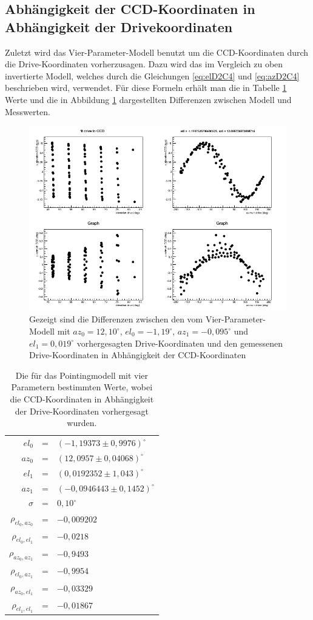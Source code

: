 \subsection{Abhängigkeit der CCD-Koordinaten in Abhängigkeit der Drivekoordinaten}
Zuletzt wird das Vier-Parameter-Modell benutzt um die CCD-Koordinaten durch die Drive-Koordinaten vorherzusagen. Dazu wird das im Vergleich zu oben invertierte Modell, welches durch die Gleichungen \ref{eq:elD2C4} und \ref{eq:azD2C4} beschrieben wird, verwendet. Für diese Formeln erhält man die in Tabelle \ref{tab:D2C4} Werte und die in Abbildung \ref{img:D2C4} dargestellten Differenzen zwischen Modell und Messwerten.
\begin{figure}[htbp]
\centering
\includegraphics[width=\textwidth]{../341/run341D2C4.png}
\caption{Gezeigt sind die Differenzen zwischen den vom Vier-Parameter-Modell mit $az_0=12,10^{\circ}$, $el_0=-1,19^{\circ}$, $az_1=-0,095^{\circ}$ und $el_1=0,019^{\circ}$ vorhergesagten Drive-Koordinaten und den gemessenen Drive-Koordinaten in Abhängigkeit der CCD-Koordinaten}
\label{img:D2C4}
\end{figure}
\begin{table}[htbp]
\centering
\begin{tabular}{rcl}
\toprule
$el_0$ &=& $(-1,19373\pm 0,9976)^{\circ}$\\
$az_0$ &=& $(12,0957\pm0,04068)^{\circ}$\\
$el_1$ &=& $(0,0192352\pm 1,043)^{\circ}$\\
$az_1$ &=& $(-0,0946443\pm0,1452)^{\circ}$\\
$\sigma$ &=& $0,10^{\circ}$\\
$\rho_{el_0,az_0}$&=& $-0,009202$\\
$\rho_{el_0,el_1}$&=& $-0,0218$\\
$\rho_{az_0,az_1}$&=& $-0,9493$\\
$\rho_{el_0,az_1}$&=& $-0,9954$\\
$\rho_{az_0,el_1}$&=& $-0,03329$\\
$\rho_{el_1,el_1}$&=& $-0,01867$\\
\bottomrule
\end{tabular}
\label{tab:D2C4}
\caption{Die für das Pointingmodell mit vier Parametern bestimmten Werte, wobei die CCD-Koordinaten in Abhängigkeit der Drive-Koordinaten vorhergesagt wurden.}
\end{table}


